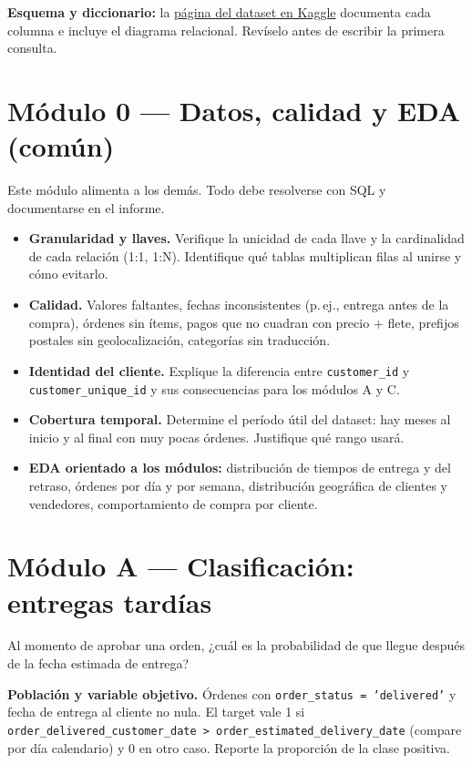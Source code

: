 \documentclass[11pt,letterpaper]{article}
\newcommand{\kaggle}{https://www.kaggle.com/datasets/olistbr/brazilian-ecommerce}
\newcommand{\tabla}[1]{\texttt{#1}}
\begin{document}
\begin{infobox}
  {\color{eafitnavy}\bfseries Esquema y diccionario:} la \href{\kaggle}{página del dataset en Kaggle} documenta cada columna e incluye el diagrama relacional. Revíselo antes de escribir la primera consulta.
\end{infobox}

\section{Módulo 0 — Datos, calidad y EDA (común)}
Este módulo alimenta a los demás. Todo debe resolverse con SQL y documentarse en el informe.
\begin{itemize}
  \item \textbf{Granularidad y llaves.} Verifique la unicidad de cada llave y la cardinalidad de cada relación (1:1, 1:N). Identifique qué tablas multiplican filas al unirse y cómo evitarlo.
  \item \textbf{Calidad.} Valores faltantes, fechas inconsistentes (p.\,ej., entrega antes de la compra), órdenes sin ítems, pagos que no cuadran con precio + flete, prefijos postales sin geolocalización, categorías sin traducción.
  \item \textbf{Identidad del cliente.} Explique la diferencia entre \tabla{customer\_id} y \tabla{customer\_unique\_id} y sus consecuencias para los módulos A y C.
  \item \textbf{Cobertura temporal.} Determine el período útil del dataset: hay meses al inicio y al final con muy pocas órdenes. Justifique qué rango usará.
  \item \textbf{EDA orientado a los módulos:} distribución de tiempos de entrega y del retraso, órdenes por día y por semana, distribución geográfica de clientes y vendedores, comportamiento de compra por cliente.
\end{itemize}

\section{Módulo A — Clasificación: entregas tardías}

\begin{questionbox}
  Al momento de aprobar una orden, ¿cuál es la probabilidad de que llegue después de la fecha estimada de entrega?
\end{questionbox}

\textbf{Población y variable objetivo.} Órdenes con \tabla{order\_status = 'delivered'} y fecha de entrega al cliente no nula. El target vale 1 si \tabla{order\_delivered\_customer\_date > order\_estimated\_delivery\_date} (compare por día calendario) y 0 en otro caso. Reporte la proporción de la clase positiva.
\end{document}
